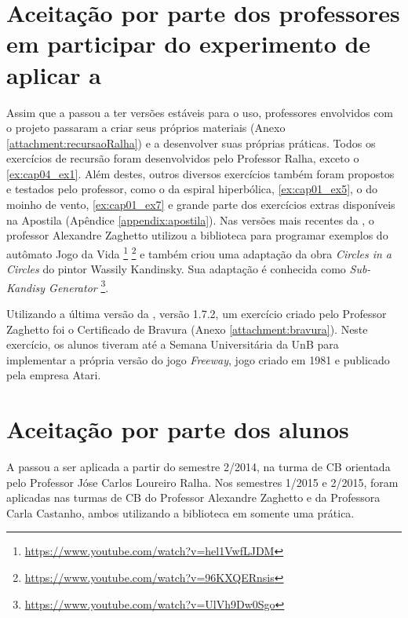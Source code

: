 
















\section{Aceitação por parte dos professores em participar do experimento de aplicar a \playAPC}

Assim que a \playAPC{} passou a ter versões estáveis para o uso, professores envolvidos com o projeto passaram a criar seus próprios materiais (Anexo \ref{attachment:recursaoRalha}) e a desenvolver suas próprias práticas. Todos os exercícios de recursão foram desenvolvidos pelo Professor Ralha, exceto o \ref{ex:cap04_ex1}. Além destes, outros diversos exercícios também foram propostos e testados pelo professor, como o da espiral hiperbólica, \ref{ex:cap01_ex5}, o do moinho de vento, \ref{ex:cap01_ex7} e grande parte dos exercícios extras disponíveis na Apostila (Apêndice \ref{appendix:apostila}). Nas versões mais recentes da \playAPC{}, o professor Alexandre Zaghetto utilizou a biblioteca para programar exemplos do autômato Jogo da Vida \footnote{\url{https://www.youtube.com/watch?v=hel1VwfLJDM}} \footnote{\url{https://www.youtube.com/watch?v=96KXQERnsis}} e também criou uma adaptação da obra \emph{Circles in a Circles} do pintor Wassily Kandinsky. Sua adaptação é conhecida como \emph{Sub-Kandisy Generator} \footnote{\url{https://www.youtube.com/watch?v=UlVh9Dw0Sgo}}.

Utilizando a última versão da \playAPC{}, versão 1.7.2, um exercício criado pelo Professor Zaghetto foi o Certificado de Bravura (Anexo \ref{attachment:bravura}). Neste exercício, os alunos tiveram até a Semana Universitária da \acrshort{UnB} para implementar a própria versão do jogo \emph{Freeway}, jogo criado em 1981 e publicado pela empresa Atari.

\section{Aceitação por parte dos alunos}
A \playAPC{} passou a ser aplicada a partir do semestre 2/2014, na turma de \acrshort{CB} orientada pelo Professor Jóse Carlos Loureiro Ralha. Nos semestres 1/2015 e 2/2015, foram aplicadas nas turmas de \acrshort{CB} do Professor Alexandre Zaghetto e da Professora Carla Castanho, ambos utilizando a biblioteca em somente uma prática.

